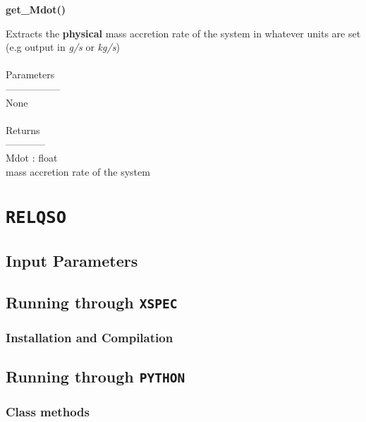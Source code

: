 \documentclass[a4paper, 11pt, times, onecolumn]{article}
\begin{document}
\vspace{1cm}

\noindent
{\bf get\_Mdot()}
\begin{adjustwidth}{1.5cm}{}

	\noindent
	Extracts the {\bf physical} mass accretion rate of the system in whatever units are set (e.g output in {\it g/s} or {\it kg/s}) 
	\\~\\
	Parameters\\
	-----------------\\
	\indent None
	\\~\\
	Returns \\
	------------\\ 
	\indent Mdot : float \\
	\indent {} mass accretion rate of the system

\end{adjustwidth}





\section{{\tt RELQSO}}

\subsection{Input Parameters}



\subsection{Running through {\tt XSPEC}}

\subsubsection{Installation and Compilation}




\subsection{Running through {\tt PYTHON}}


\subsubsection{Class methods}
\end{document}
